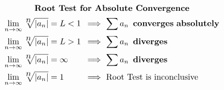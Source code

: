 \begin{center}
\begin{footnotesize}
\[\begin{gathered}
\\%
\begin{gathered}[t]\textbf{Root Test for Absolute Convergence}\\
\begin{alignedat}{3}
  \lim_{n\to\infty} \sqrt[\displaystyle n]{\left|a_n\right|}
  &=L<1
    &\enspace\implies\ &
  {\small\sum}\,a_n\enspace\mathbf{converges\ absolutely}
\\
  \lim_{n\to\infty} \sqrt[\displaystyle n]{\left|a_n\right|}
  &=L>1
    &\enspace\implies\ &
  {\small\sum}\,a_n\enspace\mathbf{diverges}
\\
  \lim_{n\to\infty} \sqrt[\displaystyle n]{\left|a_n\right|}
  &=\infty
    &\enspace\implies\ &
  {\small\sum}\,a_n\enspace\mathbf{diverges}
\\
  \lim_{n\to\infty} \sqrt[\displaystyle n]{\left|a_n\right|}
  &=1
    &\enspace\implies\ &
  \text{Root Test is inconclusive}
\end{alignedat}\end{gathered}
\end{gathered}
\]


\end{footnotesize}
\end{center}
\endgroup
